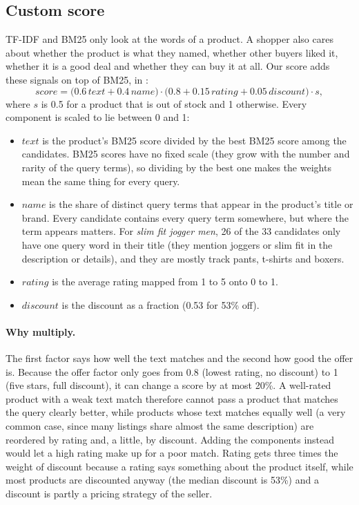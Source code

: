 \documentclass[11pt,a4paper]{article}
\begin{document}
\subsection{Custom score}
\label{sec:custom}

TF-IDF and BM25 only look at the words of a product. A shopper also cares
about whether the product is what they named, whether other buyers liked it,
whether it is a good deal and whether they can buy it at all. Our score adds
these signals on top of BM25, in :
\[
  \mathit{score} =
  \bigl(0.6\,\mathit{text} + 0.4\,\mathit{name}\bigr)
  \cdot \bigl(0.8 + 0.15\,\mathit{rating} + 0.05\,\mathit{discount}\bigr)
  \cdot s,
\]
where $s$ is 0.5 for a product that is out of stock and 1 otherwise. Every
component is scaled to lie between 0 and 1:

\begin{itemize}
  \item $\mathit{text}$ is the product's BM25 score divided by the best BM25
  score among the candidates. BM25 scores have no fixed scale (they grow with
  the number and rarity of the query terms), so dividing by the best one makes
  the weights mean the same thing for every query.
  \item $\mathit{name}$ is the share of distinct query terms that appear in the
  product's title or brand. Every candidate contains every query term
  somewhere, but where the term appears matters. For \emph{slim fit jogger
  men}, 26 of the 33 candidates only have one query word in their title (they
  mention joggers or slim fit in the description or details), and they are
  mostly track pants, t-shirts and boxers.
  \item $\mathit{rating}$ is the average rating mapped from 1 to 5 onto 0 to 1.
  \item $\mathit{discount}$ is the discount as a fraction (0.53 for 53\% off).
\end{itemize}

\paragraph{Why multiply.} The first factor says how well the text matches and
the second how good the offer is. Because the offer factor only goes from 0.8
(lowest rating, no discount) to 1 (five stars, full discount), it can change a
score by at most 20\%. A well-rated product with a weak text match therefore
cannot pass a product that matches the query clearly better, while products
whose text matches equally well (a very common case, since many listings share
almost the same description) are reordered by rating and, a little, by
discount. Adding the components instead would let a high rating make up for a
poor match. Rating gets three times the weight of discount because a rating
says something about the product itself, while most products are discounted
anyway (the median discount is 53\%) and a discount is partly a pricing
strategy of the seller.
\end{document}
